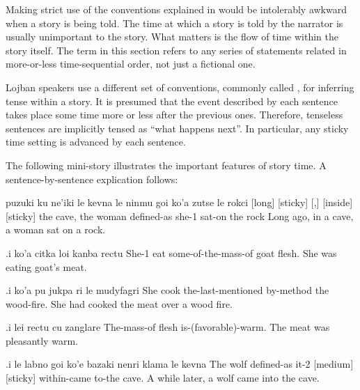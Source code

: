 Making strict use of the conventions explained in  would be intolerably awkward when a
    story is being told. The time at which a story is told by the
    narrator is usually unimportant to the story. What matters is
    the flow of time within the story itself. The term  in
    this section refers to any series of statements related in
    more-or-less time-sequential order, not just a fictional
    one.

Lojban speakers use a different set of conventions, commonly
    called , for inferring tense within a story. It
    is presumed that the event described by each sentence takes
    place some time more or less after the previous ones.
    Therefore, tenseless sentences are implicitly tensed as ``what
    happens next''. In particular, any sticky time setting is
    advanced by each sentence.

The following mini-story illustrates the important features
    of story time. A sentence-by-sentence explication follows:
\begin{example}
puzuki ku ne'iki le kevna\n
\T	le ninmu goi ko'a zutse le rokci\n
{} [long] [sticky] [,] [inside] [sticky] the cave,\n
\T	the woman defined-as she-1 sat-on the rock\n
Long ago, in a cave, a woman sat on a rock.
\end{example}

\begin{example}
.i ko'a citka loi kanba rectu\n
She-1  eat some-of-the-mass-of goat flesh.\n
She was eating goat's meat.
\end{example}

\begin{example}
.i ko'a pu jukpa ri le mudyfagri\n
She  cook the-last-mentioned\n
\T	by-method the wood-fire.\n
She had cooked the meat over a wood fire.
\end{example}

\begin{example}
.i lei rectu cu zanglare\n
The-mass-of flesh is-(favorable)-warm.\n
The meat was pleasantly warm.
\end{example}

\begin{example}
.i le labno goi ko'e bazaki\n
\T	nenri klama le kevna\n
The wolf defined-as it-2  [medium] [sticky]\n
\T	within-came to-the cave.\n
A while later, a wolf came into the cave.
\end{example}

